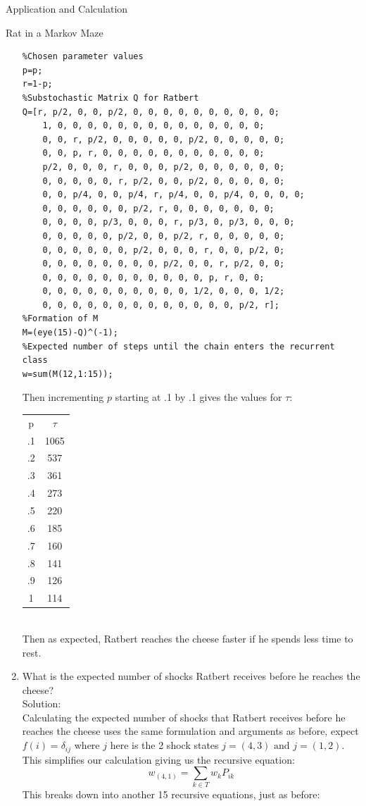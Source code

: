 \documentclass[12pt]{article}
\numberwithin{equation}{section}
\begin{document}
\begin{section}{Application and Calculation}
\begin{subsection}{Rat in a Markov Maze}
\begin{enumerate}
\begin{lstlisting}
%Chosen parameter values
p=p;
r=1-p;
%Substochastic Matrix Q for Ratbert
Q=[r, p/2, 0, 0, p/2, 0, 0, 0, 0, 0, 0, 0, 0, 0, 0;
    1, 0, 0, 0, 0, 0, 0, 0, 0, 0, 0, 0, 0, 0, 0;
    0, 0, r, p/2, 0, 0, 0, 0, 0, p/2, 0, 0, 0, 0, 0;
    0, 0, p, r, 0, 0, 0, 0, 0, 0, 0, 0, 0, 0, 0;
    p/2, 0, 0, 0, r, 0, 0, 0, p/2, 0, 0, 0, 0, 0, 0;
    0, 0, 0, 0, 0, r, p/2, 0, 0, p/2, 0, 0, 0, 0, 0;
    0, 0, p/4, 0, 0, p/4, r, p/4, 0, 0, p/4, 0, 0, 0, 0;
    0, 0, 0, 0, 0, 0, p/2, r, 0, 0, 0, 0, 0, 0, 0;
    0, 0, 0, 0, p/3, 0, 0, 0, r, p/3, 0, p/3, 0, 0, 0;
    0, 0, 0, 0, 0, p/2, 0, 0, p/2, r, 0, 0, 0, 0, 0;
    0, 0, 0, 0, 0, 0, p/2, 0, 0, 0, r, 0, 0, p/2, 0;
    0, 0, 0, 0, 0, 0, 0, 0, p/2, 0, 0, r, p/2, 0, 0;
    0, 0, 0, 0, 0, 0, 0, 0, 0, 0, 0, p, r, 0, 0;
    0, 0, 0, 0, 0, 0, 0, 0, 0, 0, 1/2, 0, 0, 0, 1/2;
    0, 0, 0, 0, 0, 0, 0, 0, 0, 0, 0, 0, 0, p/2, r];
%Formation of M
M=(eye(15)-Q)^(-1);
%Expected number of steps until the chain enters the recurrent class
w=sum(M(12,1:15));
\end{lstlisting}
Then incrementing $p$ starting at .1 by .1 gives the values for $\tau$:
\begin{tabular}{|c|c|}
  \hline
   p & $\tau$ \\
   .1 & 1065 \\
   .2& 537 \\
   .3& 361 \\
   .4& 273 \\
   .5& 220 \\
   .6& 185 \\
   .7& 160 \\
   .8& 141 \\
   .9& 126 \\
   1&114\\
  \hline
\end{tabular}\\

Then as expected, Ratbert reaches the cheese faster if he spends less time to rest.
\item What is the expected number of shocks Ratbert receives before he reaches the cheese?\\

Solution:\\

Calculating the expected number of shocks that Ratbert receives before he reaches the cheese uses the same formulation and arguments as before, expect $f(i)=\delta_{ij}$ where $j$ here is the 2 shock states $j=(4,3)\text{ and }j=(1,2)$. This simplifies our calculation giving us the recursive equation:
$$w_{(4,1)}=\sum_{k\in T}w_k P_{ik}$$
This breaks down into another 15 recursive equations, just as before:


\end{enumerate}
\end{subsection}
\end{section}
\end{document}
